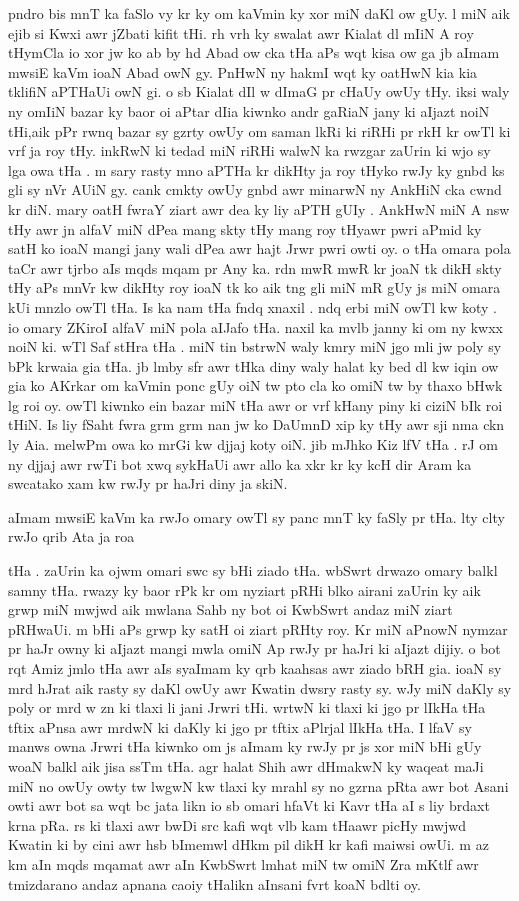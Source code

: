 \documentclass[a4paper]{article}
\begin{document}
pndro bis mnT ka faSlo vy kr ky om kaVmin ky xor miN daKl ow  gUy.
l miN aik ejib si Kwxi awr jZbati kifit tHi.
rh vrh ky swalat awr Kialat dl mIiN A roy tHymCla io xor jw ko ab by hd Abad ow cka tHa aPs wqt kisa ow ga jb aImam mwsiE kaVm ioaN Abad owN gy.
PnHwN ny hakmI wqt ky oatHwN kia kia tklifiN aPTHaUi owN gi.
o sb Kialat dIl w dImaG pr cHaUy owUy tHy.
iksi waly ny omIiN bazar ky baor oi aPtar  dIia kiwnko andr gaRiaN jany ki aIjazt noiN tHi,aik pPr rwnq bazar sy gzrty owUy om saman lkRi ki riRHi pr rkH kr owTl ki vrf ja roy tHy.
inkRwN ki tedad  miN riRHi walwN ka rwzgar zaUrin ki wjo sy lga owa tHa .
m sary rasty mno aPTHa kr dikHty ja roy tHyko rwJy ky gnbd ks gli sy nVr AUiN gy.
cank cmkty owUy gnbd awr minarwN ny AnkHiN cka cwnd kr diN.
mary oatH fwraY  ziart awr dea ky liy aPTH gUIy  .
AnkHwN miN A nsw tHy awr jn alfaV miN dPea mang skty tHy mang roy tHyawr pwri aPmid ky satH ko ioaN mangi jany wali dPea awr hajt Jrwr pwri owti oy.
o tHa omara pola taCr awr tjrbo aIs mqds mqam pr Any ka.
rdn mwR mwR kr  joaN tk dikH skty tHy aPs mnVr kw dikHty roy ioaN tk ko aik tng  gli miN mR gUy js miN omara kUi mnzlo owTl tHa.
Is ka nam tHa fndq xnaxil .
ndq erbi miN owTl kw koty  .
io omary ZKiroI alfaV miN pola aIJafo tHa.
naxil ka mvlb janny ki om ny kwxx noiN ki.
wTl Saf stHra tHa .
miN tin bstrwN waly kmry  miN jgo mli jw poly sy bPk krwaia gia tHa.
jb lmby sfr awr tHka diny waly halat ky bed dl kw iqin ow gia ko AKrkar om kaVmin ponc gUy oiN tw pto cla ko omiN tw by thaxo bHwk lg roi oy.
owTl kiwnko ein bazar miN tHa awr or vrf kHany piny ki ciziN bIk roi tHiN.
Is liy fSaht fwra grm grm nan jw ko DaUmnD xip ky tHy awr sji nma ckn ly Aia.
melwPm owa ko mrGi kw djjaj koty oiN.
jib mJhko Kiz lfV tHa .
rJ om ny djjaj awr rwTi bot xwq sykHaUi awr allo ka xkr kr ky kcH dir Aram ka swcatako xam kw rwJy pr haJri diny ja skiN.

aImam mwsiE kaVm ka rwJo omary owTl sy panc mnT ky faSly pr tHa.
lty clty rwJo qrib Ata ja roa

tHa .
zaUrin ka ojwm omari swc sy bHi ziado tHa.
wbSwrt drwazo omary balkl samny tHa.
rwazy ky baor rPk kr om nyziart  pRHi blko airani zaUrin ky aik grwp miN mwjwd aik mwlana Sahb ny  bot oi KwbSwrt andaz miN ziart pRHwaUi.
m bHi aPs grwp ky satH oi ziart  pRHty roy.
Kr miN aPnowN nymzar pr haJr owny ki aIjazt mangi mwla omiN Ap rwJy pr haJri ki aIjazt dijiy.
o bot rqt Amiz jmlo tHa awr aIs syaImam ky qrb kaahsas awr ziado bRH gia.
ioaN sy mrd hJrat aik rasty sy daKl owUy awr Kwatin dwsry rasty sy.
wJy miN daKly sy poly or mrd   w  zn ki tlaxi li jani  Jrwri tHi.
wrtwN ki tlaxi ki jgo pr lIkHa tHa tftix aPnsa awr mrdwN ki daKly ki jgo pr tftix aPlrjal lIkHa tHa.
I lfaV sy manws owna Jrwri tHa kiwnko om js aImam ky rwJy pr js xor miN bHi gUy woaN balkl aik jisa ssTm tHa.
agr halat Shih awr dHmakwN ky waqeat maJi miN no owUy owty tw lwgwN kw tlaxi ky mrahl sy no gzrna pRta awr bot Asani owti awr bot sa wqt bc jata likn io sb omari hfaVt ki Kavr tHa aI s liy brdaxt krna pRa.
rs ki tlaxi awr bwDi src kafi wqt vlb kam tHaawr picHy mwjwd Kwatin ki by cini awr  hsb  bImemwl dHkm pil dikH kr kafi maiwsi owUi.
m az km aIn mqds mqamat  awr aIn KwbSwrt lmhat miN tw omiN Zra mKtlf awr tmizdarano andaz apnana caoiy tHalikn aInsani fvrt koaN bdlti oy.
\end{document}
